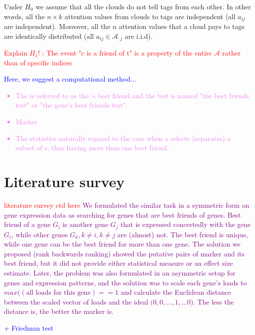 \documentclass{llncs}
\begin{document}
Under $H_0$ we assume that all the clouds do not tell tags from each other.
In other words, all the $n \times k$ attention values from clouds to tags are independent (all $a_{ij}$ are independent). Moreover, all the $n$ attention values that a cloud pays to tags are identically distributed (all $a_{ij} \in \mathcal{A}_{:j}$ are i.i.d).

\textcolor{red}{Explain $H_1$! : The event "c is a friend of t" is a property of the entire $\mathcal{A}$ rather than of specific indices}

\textcolor{blue}{Here, we suggest a computational method...}

\textcolor{violet}{\begin{itemize}
    \item The {\cloud} is referred to as the {\tag}'s best friend and the test is named "the best friends test" or "the gene's best friends test".
    \item Marker
    \item The statistics naturally expand to the case when a {\tag} selects (separates) a subset of {\cloud}s, thus having more than one best friend.
\end{itemize}}


\section{Literature survey}
\textcolor{red}{literature survey ctd here}
\textcolor{purple}{We formulated \cite{best_friends:2015} the similar task in a symmetric form on gene expression data as searching for genes that are best friends of genes. Best friend of a gene $G_i$ is another gene $G_j$ that is expressed concertedly with the gene $G_i$, while other genes $G_k, k\neq i, k \neq j$ are (almost) not. The best friend is unique, while one gene can be the best friend for more than one gene. The solution we proposed (rank backwards ranking) showed the putative pairs of marker and its best friend, but it did not provide either statistical measure or an effect size estimate. Later, the problem was also formulated in an asymmetric setup \cite{patternmarkers:2017} for genes and expression patterns, and the solution was to scale each gene's loads to $max((\mbox{all loads for this gene})==1$ and calculate the Euclidean distance between the scaled vector of loads and the ideal $(0,0,...,1,...0$). The less the distance is, the better the marker is. }

\textcolor{blue}{+ Friedman test }
\end{document}

